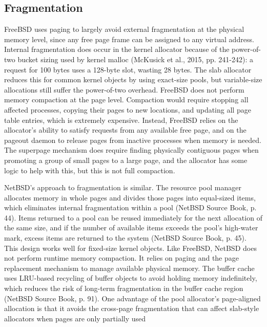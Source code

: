 \subsection{Fragmentation}
FreeBSD uses paging to largely avoid external fragmentation at the physical memory level, since any free page frame can be assigned to any virtual address. Internal fragmentation does occur in the kernel allocator because of the power-of-two bucket sizing used by kernel malloc (McKusick et al., 2015, pp. 241-242): a request for 100 bytes uses a 128-byte slot, wasting 28 bytes. The slab allocator reduces this for common kernel objects by using exact-size pools, but variable-size allocations still suffer the power-of-two overhead.
FreeBSD does not perform memory compaction at the page level. Compaction would require stopping all affected processes, copying their pages to new locations, and updating all page table entries, which is extremely expensive. Instead, FreeBSD relies on the allocator's ability to satisfy requests from any available free page, and on the pageout daemon to release pages from inactive processes when memory is needed. The superpage mechanism does require finding physically contiguous pages when promoting a group of small pages to a large page, and the allocator has some logic to help with this, but this is not full compaction.

NetBSD's approach to fragmentation is similar. The resource pool manager allocates memory in whole pages and divides those pages into equal-sized items, which eliminates internal fragmentation within a pool (NetBSD Source Book, p. 44). Items returned to a pool can be reused immediately for the next allocation of the same size, and if the number of available items exceeds the pool's high-water mark, excess items are returned to the system (NetBSD Source Book, p. 45). This design works well for fixed-size kernel objects.
Like FreeBSD, NetBSD does not perform runtime memory compaction. It relies on paging and the page replacement mechanism to manage available physical memory. The buffer cache uses LRU-based recycling of buffer objects to avoid holding memory indefinitely, which reduces the risk of long-term fragmentation in the buffer cache region (NetBSD Source Book, p. 91). One advantage of the pool allocator's page-aligned allocation is that it avoids the cross-page fragmentation that can affect slab-style allocators when pages are only partially used

